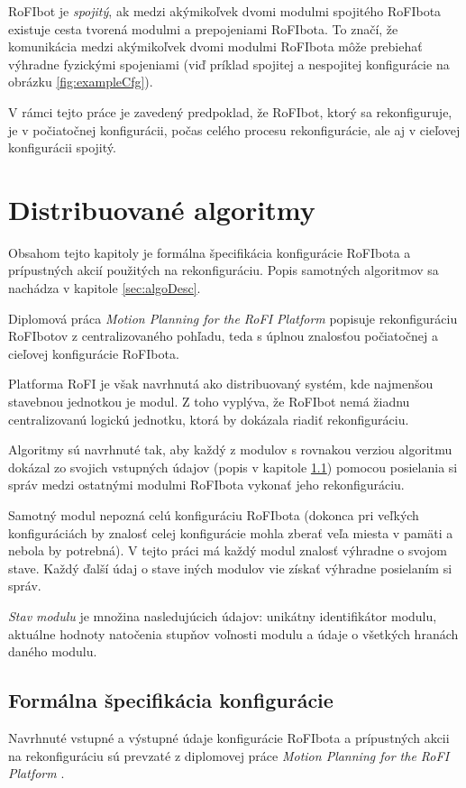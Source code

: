 \documentclass[
  digital, %
  twoside, %
  table,   %
  nolof,     %
  nolot,     %
]{fithesis3}
\begin{document}
RoFIbot je \textit{spojitý}, ak medzi akýmikoľvek dvomi modulmi spojitého RoFIbota existuje cesta tvorená modulmi a prepojeniami RoFIbota. To značí, že komunikácia medzi akýmikoľvek dvomi modulmi RoFIbota môže prebiehať výhradne fyzickými spojeniami (viď príklad spojitej a nespojitej konfigurácie na obrázku \ref{fig:exampleCfg}). 

V rámci tejto práce je zavedený predpoklad, že RoFIbot, ktorý sa rekonfiguruje, je v počiatočnej konfigurácii, počas celého procesu rekonfigurácie, ale aj v cieľovej konfigurácii spojitý. 

\chapter{Distribuované algoritmy}
\label{sec:distributedAlgo}
Obsahom tejto kapitoly je formálna špecifikácia konfigurácie RoFIbota a prípustných akcií použitých na rekonfiguráciu. Popis samotných algoritmov sa nachádza v kapitole \ref{sec:algoDesc}. 

Diplomová práca \textit{Motion Planning for the RoFI Platform} \cite{vozarovaMasterThesis} popisuje rekonfiguráciu RoFIbotov z centralizovaného pohľadu, teda s úplnou znalosťou počiatočnej a cieľovej konfigurácie RoFIbota. 

Platforma RoFI je však navrhnutá ako distribuovaný systém, kde najmenšou stavebnou jednotkou je modul. Z toho vyplýva, že RoFIbot nemá žiadnu centralizovanú logickú jednotku, ktorá by dokázala riadiť rekonfiguráciu. 

Algoritmy sú navrhnuté tak, aby každý z modulov s rovnakou verziou algoritmu dokázal zo svojich vstupných údajov (popis v kapitole \ref{sec:inputOutput}) pomocou posielania si správ medzi ostatnými modulmi RoFIbota vykonať jeho rekonfiguráciu. 

Samotný modul nepozná celú konfiguráciu RoFIbota (dokonca pri veľkých konfiguráciách by znalosť celej konfigurácie mohla zberať veľa miesta v pamäti a nebola by potrebná). V tejto práci má každý modul znalosť výhradne o svojom stave. Každý ďalší údaj o stave iných modulov vie získať výhradne posielaním si správ. 

\textit{Stav modulu} je množina nasledujúcich údajov: unikátny identifikátor modulu, aktuálne hodnoty natočenia stupňov voľnosti modulu a údaje o všetkých hranách daného modulu. 

\section{Formálna špecifikácia konfigurácie}
\label{sec:inputOutput}
Navrhnuté vstupné a výstupné údaje konfigurácie RoFIbota a prípustných akcii na rekonfiguráciu sú prevzaté z diplomovej práce \textit{Motion Planning for the RoFI Platform} \cite{vozarovaMasterThesis}. 
\end{document}
